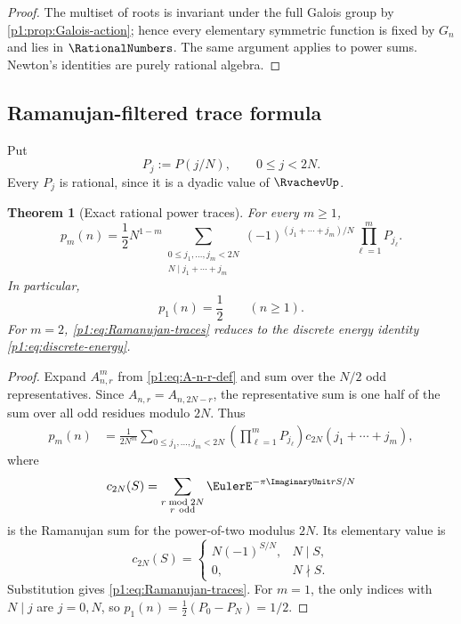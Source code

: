 \documentclass[11pt,oneside]{article}
\newtheorem{theorem}{Theorem}[section]
\theoremstyle{definition}
\theoremstyle{remark}
\begin{document}
\begin{proof}
The multiset of roots is invariant under the full Galois group by
\cref{p1:prop:Galois-action}; hence every elementary symmetric function is fixed
by $G_n$ and lies in $\RationalNumbers$.  The same argument applies to power sums.  Newton's
identities are purely rational algebra.
\end{proof}

\subsection{Ramanujan-filtered trace formula}

Put
\begin{equation}\label{p1:eq:P-j-sample}
 P_j:=P(j/N),
 \qquad 0\le j<2N.
\end{equation}
Every $P_j$ is rational, since it is a dyadic value of $\RvachevUp$.

\begin{theorem}[Exact rational power traces]\label{p1:thm:Ramanujan-traces}
For every $m\ge1$,
\begin{equation}\label{p1:eq:Ramanujan-traces}
\boxed{
 p_m(n)=\frac12N^{1-m}
 \sum_{\substack{0\le j_1,\ldots,j_m<2N\\
                  N\mid j_1+\cdots+j_m}}
 (-1)^{(j_1+\cdots+j_m)/N}
 \prod_{\ell=1}^{m}P_{j_\ell}.}
\end{equation}
In particular,
\begin{equation}\label{p1:eq:universal-trace}
 \boxed{p_1(n)=\frac12\qquad(n\ge1).}
\end{equation}
For $m=2$, \eqref{p1:eq:Ramanujan-traces} reduces to the discrete energy identity
\eqref{p1:eq:discrete-energy}.
\end{theorem}

\begin{proof}
Expand $A_{n,r}^m$ from \eqref{p1:eq:A-n-r-def} and sum over the $N/2$ odd
representatives.  Since $A_{n,r}=A_{n,2N-r}$, the representative sum is one
half of the sum over all odd residues modulo $2N$.  Thus
\begin{align*}
 p_m(n)
 &=\frac{1}{2N^m}
 \sum_{0\le j_1,\ldots,j_m<2N}
 \left(\prod_{\ell=1}^mP_{j_\ell}\right)
 c_{2N}(j_1+\cdots+j_m),
\end{align*}
where
\[
 c_{2N}(S)=\sum_{\substack{r\bmod 2N\\r\ \mathrm{odd}}}
 \EulerE^{-\pi\ImaginaryUnit rS/N}
\]
is the Ramanujan sum for the power-of-two modulus $2N$.  Its elementary value is
\begin{equation}\label{p1:eq:Ramanujan-power-two}
 c_{2N}(S)=
 \begin{cases}
  N(-1)^{S/N},&N\mid S,\\
  0,&N\nmid S.
 \end{cases}
\end{equation}
Substitution gives \eqref{p1:eq:Ramanujan-traces}.  For $m=1$, the only indices
with $N\mid j$ are $j=0,N$, so
$p_1(n)=\tfrac12(P_0-P_N)=1/2$.
\end{proof}
\end{document}
